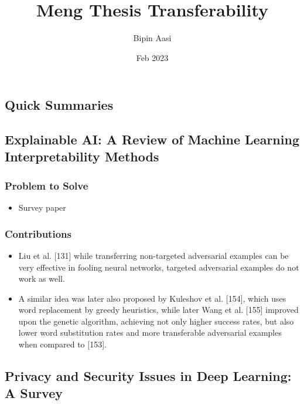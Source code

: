 \documentclass{article}
\title{Meng Thesis Transferability}
\author{Bipin Aasi}
\date{Feb 2023}
\begin{document}
\maketitle

\newpage
\begin{flushleft}

\section*{Quick Summaries}



\subsection{ Explainable AI: A Review of Machine Learning Interpretability Methods } 
\subsubsection*{Problem to Solve}
\begin{itemize}
    \item  Survey paper
\end{itemize}

\subsubsection*{Contributions}
\begin{itemize}
 \item  Liu et al. [131] while transferring non-targeted adversarial examples can be very effective in fooling neural networks, targeted adversarial examples do not work as well.
 \item  A similar idea was later also proposed by Kuleshov et al. [154], which uses word replacement by greedy heuristics, while later
Wang et al. [155] improved upon the genetic algorithm, achieving not only higher success rates, but also lower word substitution rates and more transferable adversarial examples when compared to [153].
\end{itemize}







\subsection{ Privacy and Security Issues in Deep Learning: A Survey \cite{liu2020privacy}} 

\end{flushleft}
\end{document}
